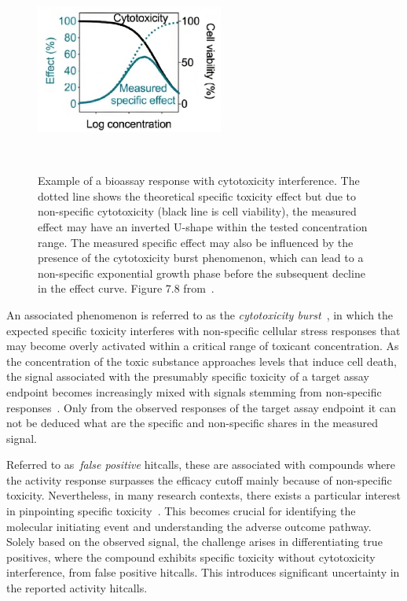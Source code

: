\begin{figure}[htbp]  %
    \centering
    \includegraphics[width=0.55\textwidth]{figures/cytotoxicity.png}  
    \caption{Example of a bioassay response with cytotoxicity interference. The dotted line shows the theoretical specific toxicity effect but due to non-specific cytotoxicity (black line is cell viability), the measured effect may have an inverted U-shape within the tested concentration range. The measured specific effect may also be influenced by the presence of the cytotoxicity burst phenomenon, which can lead to a non-specific exponential growth phase before the subsequent decline in the effect curve. Figure 7.8 from~\cite{escher2021}.}
~\label{fig:cytotoxicity} 
\end{figure}

An associated phenomenon is referred to as the \emph{cytotoxicity burst}~\cite{judson2016}, in which the expected specific toxicity interferes with non-specific cellular stress responses that may become overly activated within a critical range of toxicant concentration. As the concentration of the toxic substance approaches levels that induce cell death, the signal associated with the presumably specific toxicity of a target assay endpoint becomes increasingly mixed with signals stemming from non-specific responses~\cite{escher2021}. Only from the observed responses of the target assay endpoint it can not be deduced what are the specific and non-specific shares in the measured signal.

Referred to as~\emph{false positive} hitcalls, these are associated with compounds where the activity response surpasses the efficacy cutoff mainly because of non-specific toxicity. Nevertheless, in many research contexts, there exists a particular interest in pinpointing specific toxicity~\cite{fay2018}. This becomes crucial for identifying the molecular initiating event and understanding the adverse outcome pathway. Solely based on the observed signal, the challenge arises in differentiating true positives, where the compound exhibits specific toxicity without cytotoxicity interference, from false positive hitcalls. This introduces significant uncertainty in the reported activity hitcalls.

